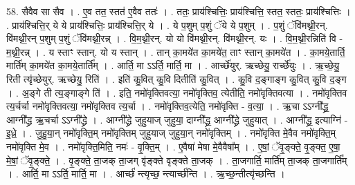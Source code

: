 \documentclass[17pt]{extarticle}
\begin{document}
58. सैवैव सा सैव । . ए॒व तत॒ स्तत॑ ए॒वैव ततः॑ । . ततः॒ प्राय॑श्चित्तिः॒ प्राय॑श्चित्ति॒ स्तत॒ स्ततः॒ प्राय॑श्चित्तिः । . प्राय॑श्चित्ति॒र् ये ये प्राय॑श्चित्तिः॒ प्राय॑श्चित्ति॒र् ये । . ये प॒शुम् प॒शुं ॅये ये प॒शुम् । . प॒शुं ॅवि॑मथ्नी॒रन्. वि॑मथ्नी॒रन् प॒शुम् प॒शुं ॅवि॑मथ्नी॒रन्न् । . वि॒म॒थ्नी॒रन्. यो यो वि॑मथ्नी॒रन्. वि॑मथ्नी॒रन्. यः । . वि॒म॒थ्नी॒रन्निति॑ वि - म॒थ्नी॒रन्न् । . य स्ताꣳ स्तान्. यो य स्तान् । . तान् का॒मये॑त का॒मये॑त॒ ताꣳ स्तान् का॒मये॑त । . का॒मये॒तार्ति॒ मार्ति॑म् का॒मये॑त का॒मये॒तार्ति᳚म् । . आर्ति॒ मा ऽऽर्ति॒ मार्ति॒ मा । . आर्च्छे॑युर्. ऋच्छेयु॒ रार्च्छे॑युः । . ऋ॒च्छे॒यु॒ रिती त्यृ॑च्छेयुर्. ऋच्छेयु॒ रिति॑ । . इति॑ कु॒वित् कु॒वि दितीति॑ कु॒वित् । . कु॒वि द॒ङ्गाङ्ग कु॒वित् कु॒वि द॒ङ्ग । . अ॒ङ्गे ती त्य॒ङ्गाङ्गे ति॑ । . इति॒ नमो॑वृक्तिवत्या॒ नमो॑वृक्तिव॒ त्येतीति॒ नमो॑वृक्तिवत्या । . नमो॑वृक्तिव त्य॒र्चर्चा नमो॑वृक्तिवत्या॒ नमो॑वृक्तिव त्य॒र्चा । . नमो॑वृक्तिव॒त्येति॒ नमो॑वृक्ति - व॒त्या॒ । . ऋ॒चा ऽऽग्नी᳚द्ध्र॒ आग्नी᳚द्ध्र ऋ॒चर्चा ऽऽग्नी᳚द्ध्रे । . आग्नी᳚द्ध्रे जुहुयाज् जुहुया॒ दाग्नी᳚द्ध्र॒ आग्नी᳚द्ध्रे जुहुयात् । . आग्नी᳚द्ध्र॒ इत्याग्नि॑ - इ॒ध्रे॒ । . जु॒हु॒या॒न् नमो॑वृक्ति॒म् नमो॑वृक्तिम् जुहुयाज् जुहुया॒न् नमो॑वृक्तिम् । . नमो॑वृक्ति मे॒वैव नमो॑वृक्ति॒म् नमो॑वृक्ति मे॒व । . नमो॑वृक्ति॒मिति॒ नमः॑ - वृ॒क्ति॒म् । . ए॒वैषा॑ मेषा मे॒वैवैषा᳚म् । . ए॒षां॒ ॅवृ॒ङ्क्ते॒ वृ॒ङ्क्त॒ ए॒षा॒ मे॒षां॒ ॅवृ॒ङ्क्ते॒ । . वृ॒ङ्क्ते॒ ता॒जक् ता॒जग् वृ॑ङ्क्ते वृङ्क्ते ता॒जक् । . ता॒जगार्ति॒ मार्ति॑म् ता॒जक् ता॒जगार्ति᳚म् । . आर्ति॒ मा ऽऽर्ति॒ मार्ति॒ मा । . आर्च्छ॑ न्त्यृच्छ॒ न्त्यार्च्छ॑न्ति । . ऋ॒च्छ॒न्तीत्यृ॑च्छन्ति । \newline
\pagebreak
{}
\end{document}

